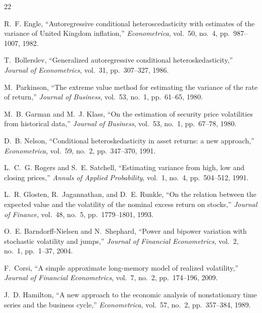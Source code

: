 


{\scriptsize{}
\begin{thebibliography}{22}

 R.~F. Engle, ``Autoregressive conditional heteroscedasticity with estimates of the variance of United Kingdom inflation,'' \emph{Econometrica}, vol.~50, no.~4, pp.~987--1007, 1982.

 T.~Bollerslev, ``Generalized autoregressive conditional heteroskedasticity,'' \emph{Journal of Econometrics}, vol.~31, pp.~307--327, 1986.

 M.~Parkinson, ``The extreme value method for estimating the variance of the rate of return,'' \emph{Journal of Business}, vol.~53, no.~1, pp.~61--65, 1980.

 M.~B. Garman and M.~J. Klass, ``On the estimation of security price volatilities from historical data,'' \emph{Journal of Business}, vol.~53, no.~1, pp.~67--78, 1980.

 D.~B. Nelson, ``Conditional heteroskedasticity in asset returns: a new approach,'' \emph{Econometrica}, vol.~59, no.~2, pp.~347--370, 1991.

 L.~C.~G. Rogers and S.~E. Satchell, ``Estimating variance from high, low and closing prices,'' \emph{Annals of Applied Probability}, vol.~1, no.~4, pp.~504--512, 1991.

 L.~R. Glosten, R.~Jagannathan, and D.~E. Runkle, ``On the relation between the expected value and the volatility of the nominal excess return on stocks,'' \emph{Journal of Finance}, vol.~48, no.~5, pp.~1779--1801, 1993.

 O.~E. Barndorff-Nielsen and N.~Shephard, ``Power and bipower variation with stochastic volatility and jumps,'' \emph{Journal of Financial Econometrics}, vol.~2, no.~1, pp.~1--37, 2004.

 F.~Corsi, ``A simple approximate long-memory model of realized volatility,'' \emph{Journal of Financial Econometrics}, vol.~7, no.~2, pp.~174--196, 2009.

 J.~D. Hamilton, ``A new approach to the economic analysis of nonstationary time series and the business cycle,'' \emph{Econometrica}, vol.~57, no.~2, pp.~357--384, 1989.


\end{thebibliography}}
